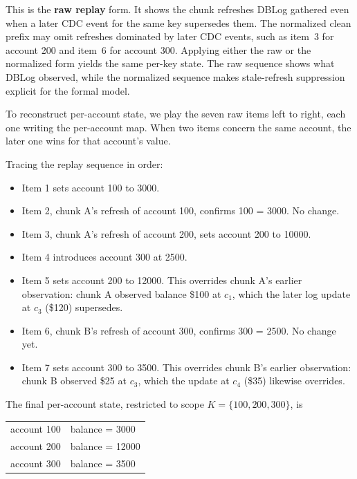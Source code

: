\documentclass[letterpaper,10pt,twocolumn]{article}
\providecommand{\tightlist}{\setlength{\itemsep}{0pt}\setlength{\parskip}{0pt}}
\begin{document}
This is the \textbf{raw replay} form. It shows the chunk refreshes DBLog
gathered even when a later CDC event for the same key supersedes them.
The normalized clean prefix may omit refreshes dominated by later CDC
events, such as item~3 for account 200 and item~6 for account 300. Applying
either the raw or the normalized form yields the same per-key state. The raw sequence
shows what DBLog observed, while the normalized sequence makes stale-refresh
suppression explicit for the formal model.

To reconstruct per-account state, we play the seven raw items left to
right, each one writing the per-account map. When two items concern the
same account, the later one wins for that account's value.

Tracing the replay sequence in order:

\begin{itemize}
\tightlist
\item
  Item 1 sets account 100 to 3000.
\item
  Item 2, chunk A's refresh of account 100, confirms 100 = 3000. No
  change.
\item
  Item 3, chunk A's refresh of account 200, sets account 200 to 10000.
\item
  Item 4 introduces account 300 at 2500.
\item
  Item 5 sets account 200 to 12000. This overrides chunk A's earlier
  observation: chunk A observed balance \$100 at $c_1$, which the later
  log update at $c_3$ (\$120) supersedes.
\item
  Item 6, chunk B's refresh of account 300, confirms 300 = 2500. No
  change yet.
\item
  Item 7 sets account 300 to 3500. This overrides chunk B's earlier
  observation: chunk B observed \$25 at $c_3$, which the update at
  $c_4$ (\$35) likewise overrides.
\end{itemize}

The final per-account state, restricted to scope $K = \{100, 200, 300\}$, is

\begin{center}\ttfamily\footnotesize
\begin{tabular}{@{}l@{\hskip 1em}l@{}}
account 100 & balance = \phantom{0}3000\\
account 200 & balance = 12000\\
account 300 & balance = \phantom{0}3500\\
\end{tabular}
\end{center}
\end{document}
